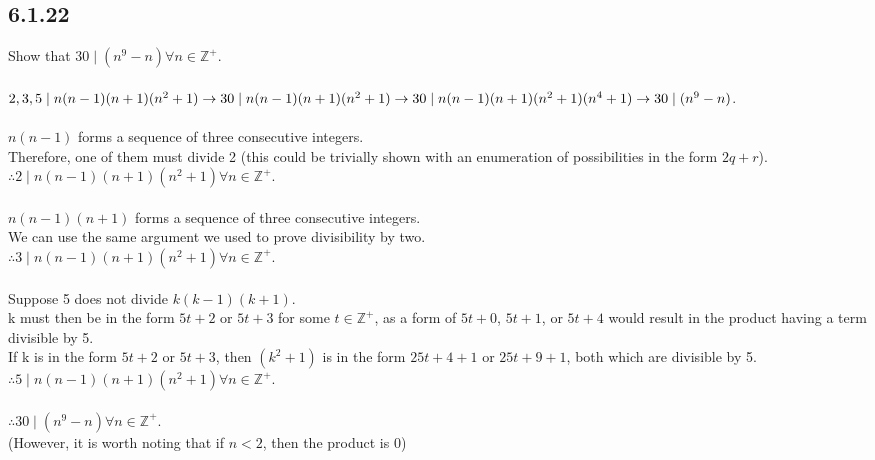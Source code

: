 \documentclass{article}
\begin{document}
\subsection{6.1.22}
Show that $30 \mid (n^9 - n)$\;\;$ \forall n \in \mathbb{Z}^+$.
\\
\\$2,3,5 \mid n(n-1)(n+1)(n^2+1) \rightarrow
\\30 \mid n(n-1)(n+1)(n^2+1) \rightarrow
\\30 \mid n(n-1)(n+1)(n^2+1)(n^4+1) \rightarrow
\\30 \mid (n^9 -n)$.
\\
\\$n(n-1)$ forms a sequence of three consecutive integers.
\\Therefore, one of them must divide 2
(this could be trivially shown with an enumeration of possibilities
in the form $2q+r$).
\\$\therefore 2 \mid n(n-1)(n+1)(n^2+1)$\;\;$ \forall n \in \mathbb{Z}^+$.
\\
\\$n(n-1)(n+1)$ forms a sequence of three consecutive integers.
\\We can use the same argument we used to prove divisibility by two.
\\$\therefore 3 \mid n(n-1)(n+1)(n^2+1)$\;\;$ \forall n \in \mathbb{Z}^+$.
\\
\\Suppose 5 does not divide $k(k-1)(k+1)$.
\\k must then be in the form $5t+2$ or $5t+3$ for some $t \in \mathbb{Z}^+$,
as a form of $5t+0$, $5t+1$, or $5t+4$
would result in the product having a term divisible by 5.
\\If k is in the form $5t+2$ or $5t+3$, then $(k^2+1)$ is in the form
$25t+4+1$ or $25t+9+1$, both which are divisible by 5.
\\$\therefore 5 \mid n(n-1)(n+1)(n^2+1)$\;\;$ \forall n \in \mathbb{Z}^+$.
\\
\\$\therefore 30 \mid (n^9 - n)$\;\;$ \forall n \in \mathbb{Z}^+$.
\\(However, it is worth noting that if $n<2$, then the product is 0)
\end{document}

